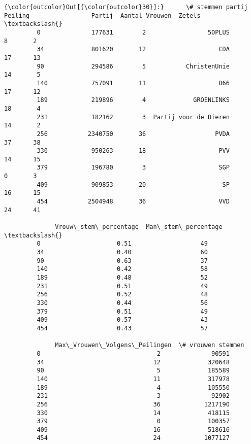 \documentclass{article}
\begin{document}
            \begin{Verbatim}[commandchars=\\\{\}]
{\color{outcolor}Out[{\color{outcolor}30}]:}      \# stemmen partij  Peiling                 Partij  Aantal Vrouwen  Zetels  \textbackslash{}
         0              177631        2                 50PLUS               8       2   
         34             801620       12                    CDA              17      13   
         90             294586        5           ChristenUnie              14       5   
         140            757091       11                    D66              17      12   
         189            219896        4             GROENLINKS              18       4   
         231            182162        3  Partij voor de Dieren              14       2   
         256           2340750       36                   PVDA              37      38   
         330            950263       18                    PVV              14      15   
         379            196780        3                    SGP               0       3   
         409            909853       20                     SP              16      15   
         454           2504948       36                    VVD              24      41   
         
              Vrouw\_stem\_percentage  Man\_stem\_percentage  \textbackslash{}
         0                     0.51                   49   
         34                    0.40                   60   
         90                    0.63                   37   
         140                   0.42                   58   
         189                   0.48                   52   
         231                   0.51                   49   
         256                   0.52                   48   
         330                   0.44                   56   
         379                   0.51                   49   
         409                   0.57                   43   
         454                   0.43                   57   
         
              Max\_Vrouwen\_Volgens\_Peilingen  \# vrouwen stemmen  
         0                                2              90591  
         34                              12             320648  
         90                               5             185589  
         140                             11             317978  
         189                              4             105550  
         231                              3              92902  
         256                             36            1217190  
         330                             14             418115  
         379                              0             100357  
         409                             16             518616  
         454                             24            1077127  
\end{Verbatim}
        
\end{document}
